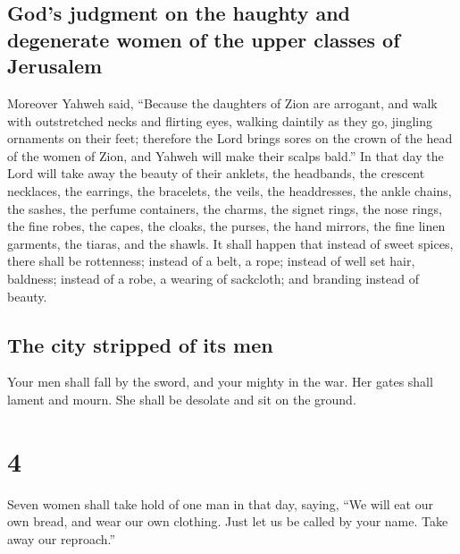 \hypertarget{gods-judgment-on-the-haughty-and-degenerate-women-of-the-upper-classes-of-jerusalem}{%
\subsection{God's judgment on the haughty and degenerate women of the
upper classes of
Jerusalem}\label{gods-judgment-on-the-haughty-and-degenerate-women-of-the-upper-classes-of-jerusalem}}

 Moreover Yahweh said, ``Because the daughters of Zion
are arrogant, and walk with outstretched necks and flirting eyes,
walking daintily as they go, jingling ornaments on their feet;
 therefore the Lord brings sores on the crown of the head
of the women of Zion, and Yahweh will make their scalps bald.''
 In that day the Lord will take away the beauty of their
anklets, the headbands, the crescent necklaces,  the
earrings, the bracelets, the veils,  the headdresses, the
ankle chains, the sashes, the perfume containers, the charms,
 the signet rings, the nose rings,  the
fine robes, the capes, the cloaks, the purses,  the hand
mirrors, the fine linen garments, the tiaras, and the shawls.
 It shall happen that instead of sweet spices, there
shall be rottenness; instead of a belt, a rope; instead of well set
hair, baldness; instead of a robe, a wearing of sackcloth; and branding
instead of beauty.

\hypertarget{the-city-stripped-of-its-men}{%
\subsection{The city stripped of its
men}\label{the-city-stripped-of-its-men}}

 Your men shall fall by the sword, and your mighty in the
war.  Her gates shall lament and mourn. She shall be
desolate and sit on the ground.

\hypertarget{section-3}{%
\section{4}\label{section-3}}

 Seven women shall take hold of one man in that day,
saying, ``We will eat our own bread, and wear our own clothing. Just let
us be called by your name. Take away our reproach.''


